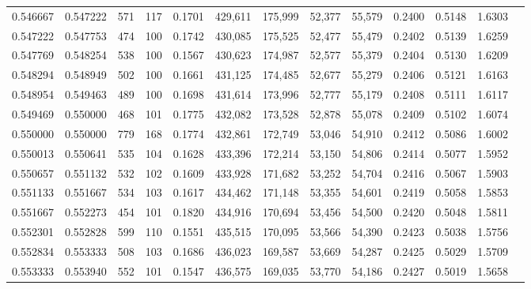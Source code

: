 \begin{tabular}{rrrrrrrrrrrrr}
0.546667 & 0.547222 &    571 &   117 &                                     0.1701 & 429,611 & 175,999 &  52,377 &  55,579 & 0.2400 & 0.5148 & 1.6303 \\
0.547222 & 0.547753 &    474 &   100 &                                     0.1742 & 430,085 & 175,525 &  52,477 &  55,479 & 0.2402 & 0.5139 & 1.6259 \\
0.547769 & 0.548254 &    538 &   100 &                                     0.1567 & 430,623 & 174,987 &  52,577 &  55,379 & 0.2404 & 0.5130 & 1.6209 \\
0.548294 & 0.548949 &    502 &   100 &                                     0.1661 & 431,125 & 174,485 &  52,677 &  55,279 & 0.2406 & 0.5121 & 1.6163 \\
0.548954 & 0.549463 &    489 &   100 &                                     0.1698 & 431,614 & 173,996 &  52,777 &  55,179 & 0.2408 & 0.5111 & 1.6117 \\
0.549469 & 0.550000 &    468 &   101 &                                     0.1775 & 432,082 & 173,528 &  52,878 &  55,078 & 0.2409 & 0.5102 & 1.6074 \\
0.550000 & 0.550000 &    779 &   168 &                                     0.1774 & 432,861 & 172,749 &  53,046 &  54,910 & 0.2412 & 0.5086 & 1.6002 \\
0.550013 & 0.550641 &    535 &   104 &                                     0.1628 & 433,396 & 172,214 &  53,150 &  54,806 & 0.2414 & 0.5077 & 1.5952 \\
0.550657 & 0.551132 &    532 &   102 &                                     0.1609 & 433,928 & 171,682 &  53,252 &  54,704 & 0.2416 & 0.5067 & 1.5903 \\
0.551133 & 0.551667 &    534 &   103 &                                     0.1617 & 434,462 & 171,148 &  53,355 &  54,601 & 0.2419 & 0.5058 & 1.5853 \\
0.551667 & 0.552273 &    454 &   101 &                                     0.1820 & 434,916 & 170,694 &  53,456 &  54,500 & 0.2420 & 0.5048 & 1.5811 \\
0.552301 & 0.552828 &    599 &   110 &                                     0.1551 & 435,515 & 170,095 &  53,566 &  54,390 & 0.2423 & 0.5038 & 1.5756 \\
0.552834 & 0.553333 &    508 &   103 &                                     0.1686 & 436,023 & 169,587 &  53,669 &  54,287 & 0.2425 & 0.5029 & 1.5709 \\
0.553333 & 0.553940 &    552 &   101 &                                     0.1547 & 436,575 & 169,035 &  53,770 &  54,186 & 0.2427 & 0.5019 & 1.5658 \\

\end{tabular}
